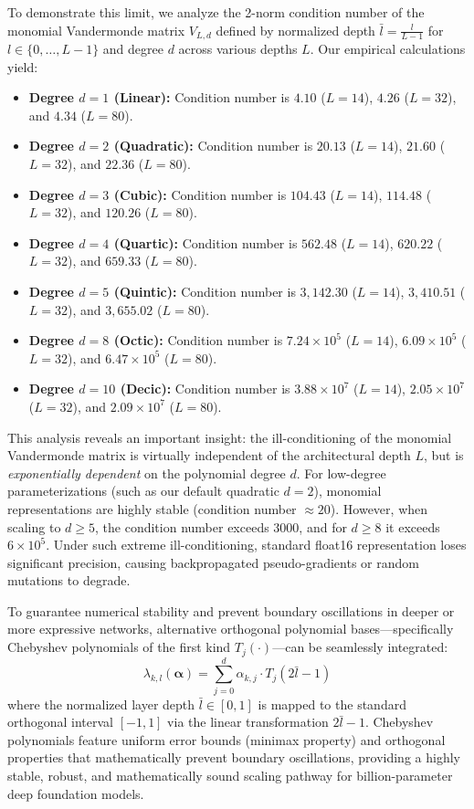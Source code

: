 To demonstrate this limit, we analyze the 2-norm condition number of the monomial Vandermonde matrix $V_{L, d}$ defined by normalized depth $\bar{l} = \frac{l}{L-1}$ for $l \in \{0, \dots, L-1\}$ and degree $d$ across various depths $L$. Our empirical calculations yield:
\begin{itemize}
    \item \textbf{Degree $d=1$ (Linear):} Condition number is $4.10$ ($L=14$), $4.26$ ($L=32$), and $4.34$ ($L=80$).
    \item \textbf{Degree $d=2$ (Quadratic):} Condition number is $20.13$ ($L=14$), $21.60$ ($L=32$), and $22.36$ ($L=80$).
    \item \textbf{Degree $d=3$ (Cubic):} Condition number is $104.43$ ($L=14$), $114.48$ ($L=32$), and $120.26$ ($L=80$).
    \item \textbf{Degree $d=4$ (Quartic):} Condition number is $562.48$ ($L=14$), $620.22$ ($L=32$), and $659.33$ ($L=80$).
    \item \textbf{Degree $d=5$ (Quintic):} Condition number is $3,142.30$ ($L=14$), $3,410.51$ ($L=32$), and $3,655.02$ ($L=80$).
    \item \textbf{Degree $d=8$ (Octic):} Condition number is $7.24 \times 10^5$ ($L=14$), $6.09 \times 10^5$ ($L=32$), and $6.47 \times 10^5$ ($L=80$).
    \item \textbf{Degree $d=10$ (Decic):} Condition number is $3.88 \times 10^7$ ($L=14$), $2.05 \times 10^7$ ($L=32$), and $2.09 \times 10^7$ ($L=80$).
\end{itemize}
This analysis reveals an important insight: the ill-conditioning of the monomial Vandermonde matrix is virtually independent of the architectural depth $L$, but is \emph{exponentially dependent} on the polynomial degree $d$. For low-degree parameterizations (such as our default quadratic $d=2$), monomial representations are highly stable (condition number $\approx 20$). However, when scaling to $d \ge 5$, the condition number exceeds $3000$, and for $d \ge 8$ it exceeds $6 \times 10^5$. Under such extreme ill-conditioning, standard float16 representation loses significant precision, causing backpropagated pseudo-gradients or random mutations to degrade.

To guarantee numerical stability and prevent boundary oscillations in deeper or more expressive networks, alternative orthogonal polynomial bases—specifically Chebyshev polynomials of the first kind $T_j(\cdot)$—can be seamlessly integrated:
\begin{equation}
\lambda_{k, l}(\boldsymbol{\alpha}) = \sum_{j=0}^d \alpha_{k, j} \cdot T_j(2\bar{l} - 1)
\end{equation}
where the normalized layer depth $\bar{l} \in [0, 1]$ is mapped to the standard orthogonal interval $[-1, 1]$ via the linear transformation $2\bar{l} - 1$. Chebyshev polynomials feature uniform error bounds (minimax property) and orthogonal properties that mathematically prevent boundary oscillations, providing a highly stable, robust, and mathematically sound scaling pathway for billion-parameter deep foundation models.

